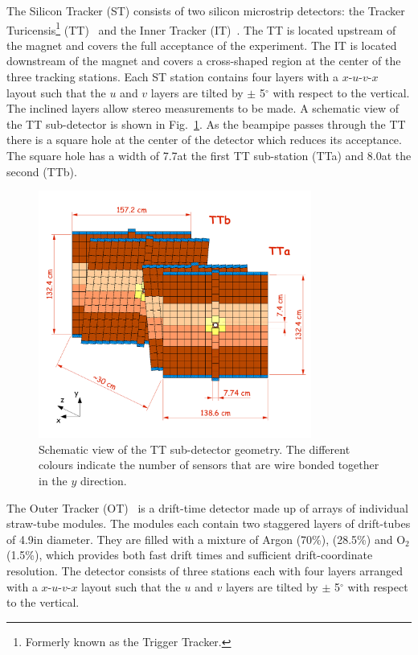 The Silicon Tracker (ST) consists of two silicon microstrip detectors: the Tracker Turicensis\footnote{Formerly known as the Trigger Tracker.} (TT)~\cite{LHCb-TDR-009} and the Inner Tracker (IT)~\cite{LHCb-TDR-008}. The TT is located upstream of the magnet and covers the full acceptance of the experiment. The IT is located downstream of the magnet and covers a cross-shaped region at the center of the three tracking stations. Each ST station contains four layers with a \mbox{$x$-$u$-$v$-$x$} layout such that the $u$ and $v$ layers are tilted by $\pm$ 5$^{\circ}$ with respect to the vertical. The inclined layers allow stereo measurements to be made. A schematic view of the TT sub-detector is shown in Fig.~\ref{fig:tt}. As the beampipe passes through the TT there is a square hole at the center of the detector which reduces its acceptance. The square hole has a width of 7.7\cm at the first TT sub-station (TTa) and 8.0\cm at the second (TTb).

\begin{figure}[!tb]
\centering
\includegraphics[width=0.8\textwidth]{figs/detector/tt.pdf}
\caption{Schematic view of the TT sub-detector geometry. The different colours indicate the number of sensors that are wire bonded together in the $y$ direction.}
\label{fig:tt}
\end{figure}

The Outer Tracker (OT)~\cite{LHCb-TDR-006,LHCb-DP-2013-003,LHCb-DP-2014-002} is a drift-time detector made up of arrays of individual straw-tube modules. The modules each contain two staggered layers of drift-tubes of 4.9\mm in diameter. They are filled with a mixture of Argon (70\%), \cotwo (28.5\%) and $\mathrm{O}_{2}$ (1.5\%), which provides both fast drift times and sufficient drift-coordinate resolution. The detector consists of three stations each with four layers arranged with a \mbox{$x$-$u$-$v$-$x$} layout such that the $u$ and $v$ layers are tilted by $\pm$ 5$^{\circ}$ with respect to the vertical.

